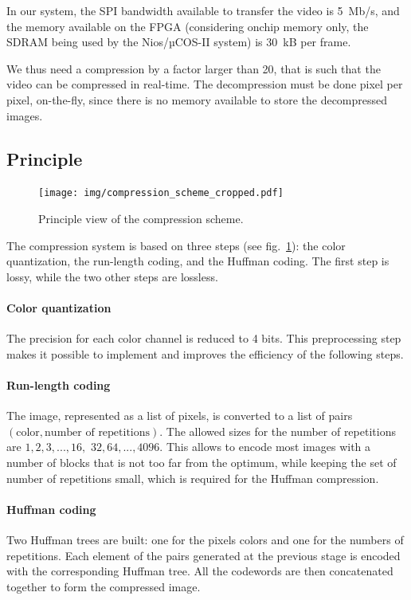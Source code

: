 \documentclass[english, DIV=13]{scrreprt}
\begin{document}
In our system, the SPI bandwidth available to transfer the video is \SI{5}{Mb/s},
and the memory available on the FPGA (considering onchip memory only, the SDRAM
being used by the Nios/µCOS-II system) is \SI{30}{kB} per frame.

We thus need a compression by a factor larger than 20, that is such that
the video can be compressed in real-time. The decompression must be done
pixel per pixel, on-the-fly, since there is no memory available to store the
decompressed images.

\subsection{Principle}

\begin{figure}[bth]
    \centering
    \texttt{[image: img/compression\_scheme\_cropped.pdf]}
    \caption{Principle view of the compression scheme.}
    \label{fig:compression}
\end{figure}

The compression system is based on three steps (see fig.~\ref{fig:compression}):
the color quantization, the run-length coding, and the Huffman coding. The first
step is lossy, while the two other steps are lossless.

\paragraph{Color quantization} The precision for each color channel is
reduced to 4 bits. This preprocessing step makes it possible
to implement and improves the efficiency of the following steps.

\paragraph{Run-length coding} The image, represented as a list of pixels,
is converted to a list of pairs $(\text{color}, \text{number of repetitions})$.
The allowed sizes for the number of repetitions are
$1, 2, 3, ..., 16,$ $32, 64, ..., 4096$. This allows to encode most images with
a number of blocks that is not too far from the optimum, while keeping the set
of number of repetitions small, which is required for the Huffman compression.

\paragraph{Huffman coding} Two Huffman trees are built: one for the pixels colors
and one for the numbers of repetitions. Each element of the pairs generated
at the previous stage is encoded with the corresponding Huffman tree.
All the codewords are then concatenated together to form the compressed image.
\end{document}
